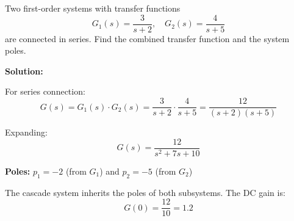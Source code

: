 \begin{example}
\label{ex:cascade}
Two first-order systems with transfer functions
\begin{equation}
G_1(s) = \frac{3}{s+2}, \quad G_2(s) = \frac{4}{s+5}
\end{equation}
are connected in series. Find the combined transfer function and the system poles.

\textbf{Solution:}

For series connection:
\begin{equation}
G(s) = G_1(s) \cdot G_2(s) = \frac{3}{s+2} \cdot \frac{4}{s+5} = \frac{12}{(s+2)(s+5)}
\end{equation}

Expanding:
\begin{equation}
\boxed{G(s) = \frac{12}{s^2 + 7s + 10}}
\end{equation}

\textbf{Poles:} $p_1 = -2$ (from $G_1$) and $p_2 = -5$ (from $G_2$)

The cascade system inherits the poles of both subsystems. The DC gain is:
\begin{equation}
G(0) = \frac{12}{10} = 1.2
\end{equation}
\end{example}

